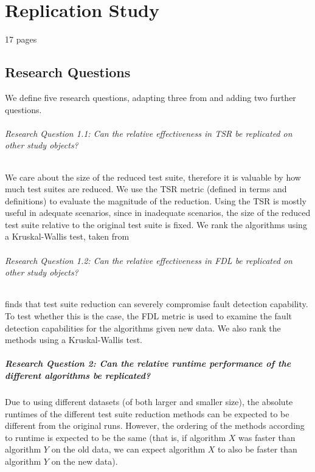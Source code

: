 
\chapter{Replication Study}\label{chapter:replication_study}


17 pages

\section{Research Questions}

We define five %
research questions, adapting three from \cite{cruciani2019scalable}
and adding two further questions.

\subparagraph{Research Question 1.1: Can the relative effectiveness in TSR be replicated on other study objects?}

We care about the size of the reduced test suite, therefore it is valuable
by how much test suites are reduced. We use the TSR metric (defined
in terms and definitions) to evaluate the magnitude of the reduction.
Using the TSR is mostly useful in adequate scenarios, since in inadequate
scenarios, the size of the reduced test suite relative to the original
test suite is fixed. We rank the algorithms using a Kruskal-Wallis test,
taken from \cite{cruciani2019scalable}

\subparagraph{Research Question 1.2: Can the relative effectiveness in FDL be replicated on other study objects?}

\cite{rothermel2002empirical} finds that test suite reduction can severely
compromise fault detection capability. To test whether this is the case,
the FDL metric is used to examine the fault detection capabilities
for the algorithms given new data. We also rank the methods using a
Kruskal-Wallis test.

\paragraph{Research Question 2: Can the relative runtime performance of the different algorithms be replicated?}

Due to using different datasets (of both larger and smaller size), the
absolute runtimes of the different test suite reduction methods can be
expected to be different from the original runs. However, the ordering of
the methods according to runtime is expected to be the same (that is, if
algorithm $X$ was faster than algorithm $Y$ on the old data, we can expect
algorithm $X$ to also be faster than algorithm $Y$ on the new data).

